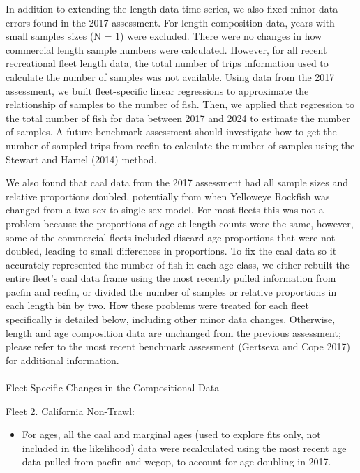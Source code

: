 \documentclass[
]{scrartcl}
\makeatletter
\let\oldparagraph\paragraph
\renewcommand{\paragraph}{
    \@ifstar
      \xxxParagraphStar
      \xxxParagraphNoStar
  }
\newcommand{\xxxParagraphStar}[1]{\oldparagraph*{#1}\mbox{}}
\newcommand{\xxxParagraphNoStar}[1]{\oldparagraph{#1}\mbox{}}
\providecommand{\tightlist}{%
  \setlength{\itemsep}{0pt}\setlength{\parskip}{0pt}}\usepackage{longtable,booktabs,array}
\makeatother
\begin{document}
In addition to extending the length data time series, we also fixed
minor data errors found in the 2017 assessment. For length composition
data, years with small samples sizes (N = 1) were excluded. There were
no changes in how commercial length sample numbers were calculated.
However, for all recent recreational fleet length data, the total number
of trips information used to calculate the number of samples was not
available. Using data from the 2017 assessment, we built fleet-specific
linear regressions to approximate the relationship of samples to the
number of fish. Then, we applied that regression to the total number of
fish for data between 2017 and 2024 to estimate the number of samples. A
future benchmark assessment should investigate how to get the number of
sampled trips from \gls{recfin} to calculate the number of samples using
the Stewart and Hamel (2014) method.

We also found that \gls{caal} data from the 2017 assessment had all
sample sizes and relative proportions doubled, potentially from when
Yelloweye Rockfish was changed from a two-sex to single-sex model. For
most fleets this was not a problem because the proportions of
age-at-length counts were the same, however, some of the commercial
fleets included discard age proportions that were not doubled, leading
to small differences in proportions. To fix the \gls{caal} data so it
accurately represented the number of fish in each age class, we either
rebuilt the entire fleet's \gls{caal} data frame using the most recently
pulled information from \gls{pacfin} and \gls{recfin}, or divided the
number of samples or relative proportions in each length bin by two. How
these problems were treated for each fleet specifically is detailed
below, including other minor data changes. Otherwise, length and age
composition data are unchanged from the previous assessment; please
refer to the most recent benchmark assessment (Gertseva and Cope 2017)
for additional information.

\paragraph{Fleet Specific Changes in the Compositional
Data}\label{fleet-specific-changes-in-the-compositional-data}

Fleet 2. California Non-Trawl:

\begin{itemize}
\tightlist
\item
  For ages, all the \gls{caal} and marginal ages (used to explore fits
  only, not included in the likelihood) data were recalculated using the
  most recent age data pulled from \gls{pacfin} and \gls{wcgop}, to
  account for age doubling in 2017.
\end{itemize}
\end{document}
